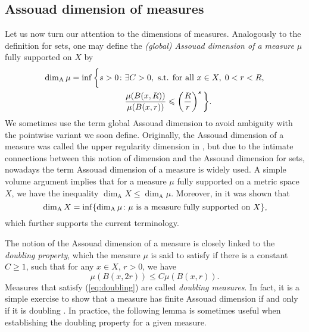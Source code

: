 \documentclass{PRM}
\newcommand{\adim}{\dim_{\mathrm{A}}}
\theoremstyle{plain}
\theoremstyle{definition}
\theoremstyle{remark}
\begin{document}
\subsection{Assouad dimension of measures}
Let us now turn our attention to the dimensions of measures. Analogously to the definition for sets, one may define the \emph{(global) Assouad dimension of a measure $\mu$} fully supported on $X$ by
\begin{align*}
    \adim \mu=\inf\bigg\{ s>0\colon& \exists C>0,\textnormal{ s.t. for all }x\in X,\; 0<r<R,\\
    &\frac{\mu(B(x,R))}{\mu(B(x,r))}\leq \left(\frac{R}{r}\right)^s\bigg\}.
\end{align*}
We sometimes use the term global Assouad dimension to avoid ambiguity with the pointwise variant we soon define.
Originally, the Assouad dimension of a measure was called the upper regularity dimension in \cite{KLV}, but due to the intimate connections between this notion of dimension and the Assouad dimension for sets, nowadays the term Assouad dimension of a measure is widely used. A simple volume argument implies that for a measure $\mu$ fully supported on a metric space $X$, we have the inequality $\adim X\leq \adim\mu$. Moreover, in \cite{VK, LS} it was shown that
\begin{equation*}
    \adim X=\inf\{\adim\mu\colon \mu\textnormal{ is a measure fully supported on }X\},
\end{equation*}
which further supports the current terminology.

The notion of the Assouad dimension of a measure is closely linked to the \emph{doubling property}, which the measure $\mu$ is said to satisfy if there is a constant $C\geq 1$, such that for any $x\in X$, $r>0$, we have
\begin{equation}\label{eq:doubling}
    \mu(B(x,2r))\leq C\mu(B(x,r)).
\end{equation}
Measures that satisfy (\ref{eq:doubling}) are called \emph{doubling measures}. In fact, it is a simple exercise to show that a measure has finite Assouad dimension if and only if it is doubling \cite[Lemma 4.1.1]{F}. In practice, the following lemma is sometimes useful when establishing the doubling property for a given measure.
\end{document}
